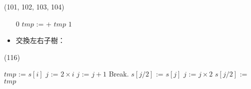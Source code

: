 \begin{theorem}{(101, 102, 103, 104)}
\begin{itemize}
\begin{algorithm}[H]
            \begin{algorithmic}[1]
                        \State \Return $0$
                    \Else
                        \State $tmp$ :=  + 
                            \State \Return $tmp$
                        \Else
                            \State \Return $1$
                        \EndIf
                    \EndIf
                \EndFunction
            \end{algorithmic}
        \end{algorithm}
        \item 交換左右子樹：\begin{algorithm}[H]
            \begin{algorithmic}[1]
                        \State {}
                        \State {}
                        \State {}
                    \EndIf
                \EndFunction
            \end{algorithmic}
        \end{algorithm}
    \end{itemize}
\end{theorem}

\item \begin{theorem}{(116)} \quad\quad
    \begin{algorithm}[H]
        \begin{algorithmic}[1]
                 
                    \State $tmp$ := $s[i]$
                    \State $j$ := $2 \times i$ 
                     
                         
                             
                                \State $j$ := $j + 1$
                            \EndIf
                        \EndIf
                            \State Break.
                        \Else {}
                            \State $s[j / 2]$ := $s[j]$
                            \State $j$ := $j \times 2$
                        \EndIf
                    \EndWhile
                    \State $s[j / 2]$ := $tmp$
                \EndFor
            \EndFunction
        \end{algorithmic}
    \end{algorithm} 
\end{theorem}

